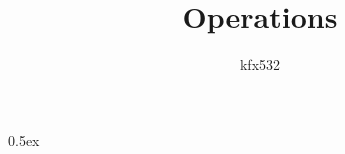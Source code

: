 \documentclass[12pt,a4paper]{article} %
\renewcommand\_{\hbox{\textunderscore\kern-.05ex}}
\begin{document}
\title{Operations}
\author{kfx532}
\maketitle

\tableofcontents

\parindent 0pt\parskip 0.5ex



%
%
\end{document}
